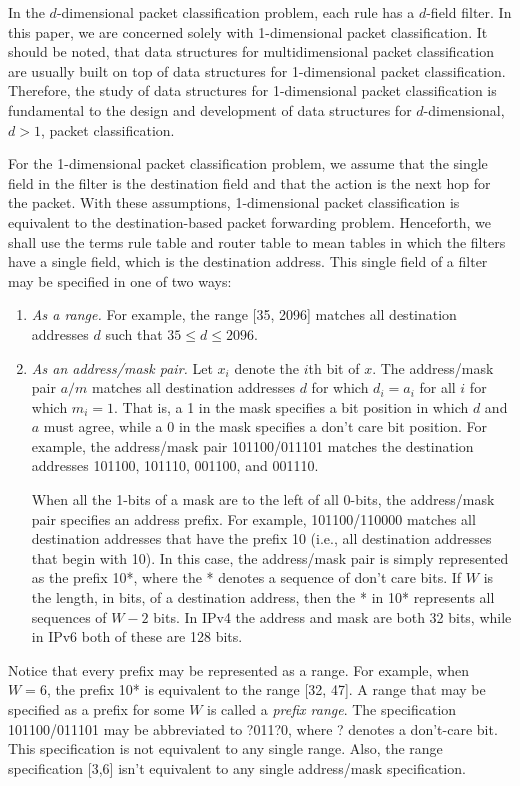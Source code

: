 In the $d$-dimensional packet classification problem, each rule has a
$d$-field filter. In this paper, we are concerned solely with
1-dimensional packet classification. It should be noted, that data
structures for multidimensional packet classification are usually built on top
of data structures for 1-dimensional packet classification.
Therefore, the study of data structures for 1-dimensional packet classification
is fundamental to the design and development of data structures for
$d$-dimensional, $d > 1$, packet classification.

For the 1-dimensional packet classification problem, we assume that the single
field in the filter is the destination field and that the
action is the next hop for the packet.
With these assumptions, 1-dimensional packet classification is equivalent to
the destination-based packet forwarding problem.
Henceforth, we shall use
the terms rule table and router table to mean tables in which the filters have
a single field, which is the destination address. This single
field of a filter
may be specified in one of two ways:
\begin{enumerate}
\item
{\em As a range.} For example, the range [35, 2096] matches all destination
addresses $d$ such that $35 \leq d \leq 2096$.
\item
{\em As an address/mask pair.}
Let $x_i$ denote the $i$th bit of $x$.
The address/mask pair $a/m$ matches all destination addresses
$d$ for which $d_i = a_i$ for all $i$ for which $m_i = 1$.
That is, a 1 in the mask specifies a bit position in which $d$
and $a$ must agree, while a 0 in the mask specifies a don't care bit position.
For example, the address/mask pair 101100/011101 matches the destination
addresses 101100, 101110, 001100, and 001110.

When all the 1-bits of a mask are to the left of all 0-bits, the address/mask
pair specifies an address prefix. For example, 101100/110000 matches all
destination addresses that have the prefix 10 (i.e., all destination
addresses that begin with 10).
In this case, the address/mask pair is simply represented as the prefix
10*, where the * denotes a sequence of don't care bits. If $W$ is the length,
in bits, of a destination address, then the * in 10* represents all sequences
of $W - 2$ bits.
In IPv4 the address and mask are both 32 bits,
while in IPv6 both of these are 128 bits.
\end{enumerate}

Notice that every prefix may be represented as a range. For example,
when $W = 6$, the prefix 10* is equivalent to the range [32, 47].
A range that may be specified as a prefix for some $W$ is called a
{\em prefix range}.
The specification 101100/011101 may be abbreviated to ?011?0, where ?
denotes a don't-care bit. This specification is not equivalent
to any single range. Also, the range specification [3,6] isn't equivalent
to any single address/mask specification.

